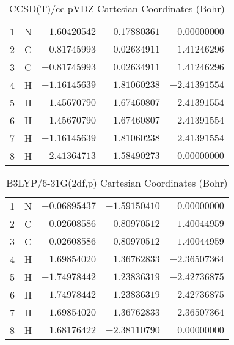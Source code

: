 \documentclass[10pt,oneside]{article}
\begin{document}
\begin{table}[h!]
\centering
\caption{CCSD(T)/cc-pVDZ Cartesian Coordinates (Bohr)}
\begin{tabular}{llrrr}
1  & N  & $ 1.60420542$ & $-0.17880361$ & $ 0.00000000$ \\
2  & C  & $-0.81745993$ & $ 0.02634911$ & $-1.41246296$ \\
3  & C  & $-0.81745993$ & $ 0.02634911$ & $ 1.41246296$ \\
4  & H  & $-1.16145639$ & $ 1.81060238$ & $-2.41391554$ \\
5  & H  & $-1.45670790$ & $-1.67460807$ & $-2.41391554$ \\
6  & H  & $-1.45670790$ & $-1.67460807$ & $ 2.41391554$ \\
7  & H  & $-1.16145639$ & $ 1.81060238$ & $ 2.41391554$ \\
8  & H  & $ 2.41364713$ & $ 1.58490273$ & $ 0.00000000$ \\
\end{tabular}
\end{table}

\begin{table}[h!]
\centering
\caption{B3LYP/6-31G(2df,p) Cartesian Coordinates (Bohr)}
\begin{tabular}{llrrr}
1  & N  & $-0.06895437$ & $-1.59150410$ & $ 0.00000000$ \\
2  & C  & $-0.02608586$ & $ 0.80970512$ & $-1.40044959$ \\
3  & C  & $-0.02608586$ & $ 0.80970512$ & $ 1.40044959$ \\
4  & H  & $ 1.69854020$ & $ 1.36762833$ & $-2.36507364$ \\
5  & H  & $-1.74978442$ & $ 1.23836319$ & $-2.42736875$ \\
6  & H  & $-1.74978442$ & $ 1.23836319$ & $ 2.42736875$ \\
7  & H  & $ 1.69854020$ & $ 1.36762833$ & $ 2.36507364$ \\
8  & H  & $ 1.68176422$ & $-2.38110790$ & $ 0.00000000$ \\
\end{tabular}
\end{table}

\clearpage
\end{document}
